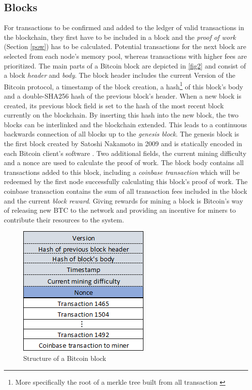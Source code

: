 \documentclass[a4paper,12pt,twoside]{report}
\begin{document}
\subsection{Blocks}
For transactions to be confirmed and added to the ledger of valid transactions in the blockchain, they first have to be included in a block and the \textit{proof of work} (Section \ref{pow}) has to be calculated. Potential transactions for the next block are selected from each node's memory pool, whereas transactions with higher fees are prioritized. The main parts of a Bitcoin block are depicted in \autoref{fig2} and consist of a block \textit{header} and \textit{body}. The block header includes the current Version of the Bitcoin protocol, a timestamp of the block creation, a hash\footnote{More specifically the root of a merkle tree built from all transaction \cite{okupski2014bitcoin}} of this block's body and a double-SHA256 hash of the previous block's header. When a new block is created, its previous block field is set to the hash of the most recent block currently on the blockchain. By inserting this hash into the new block, the two blocks can be interlinked and the blockchain extended. This leads to a continuous backwards connection of all blocks up to the \textit{genesis block}. The genesis block is the first block created by Satoshi Nakamoto in 2009 and is statically encoded in each Bitcoin client's software \cite{antonopoulos2017mastering}. Two additional fields, the current mining difficulty and a nonce are used to calculate the proof of work. The block body contains all transactions added to this block, including a \textit{coinbase transaction} which will be redeemed by the first node successfully calculating this block's proof of work. The coinbase transaction contains the sum of all transaction fees included in the block and the current \textit{block reward}. Giving rewards for mining a block is Bitcoin's way of releasing new BTC to the network and providing an incentive for miners to contribute their resources to the system. \cite{okupski2014bitcoin,antonopoulos2017mastering}
\begin{figure}[ht]
	\centering
  \includegraphics[scale=0.7]{BlockExample.png}
	\caption{Structure of a Bitcoin block \cite{DSAwithTime,okupski2014bitcoin}}
	\label{fig2}
\end{figure}
\end{document}
